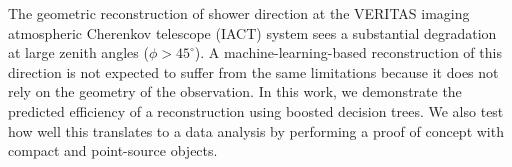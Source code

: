 \documentclass[main.tex]{subfiles}
\begin{document}
The geometric reconstruction of shower direction at the VERITAS imaging atmospheric Cherenkov telescope (IACT) system sees a substantial degradation at large zenith angles ($\phi>45^\circ$). A machine-learning-based reconstruction of this direction is not expected to suffer from the same limitations because it does not rely on the geometry of the observation. In this work, we demonstrate the predicted efficiency of a reconstruction using boosted decision trees. We also test how well this translates to a data analysis by performing a proof of concept with compact and point-source objects.
\end{document}

